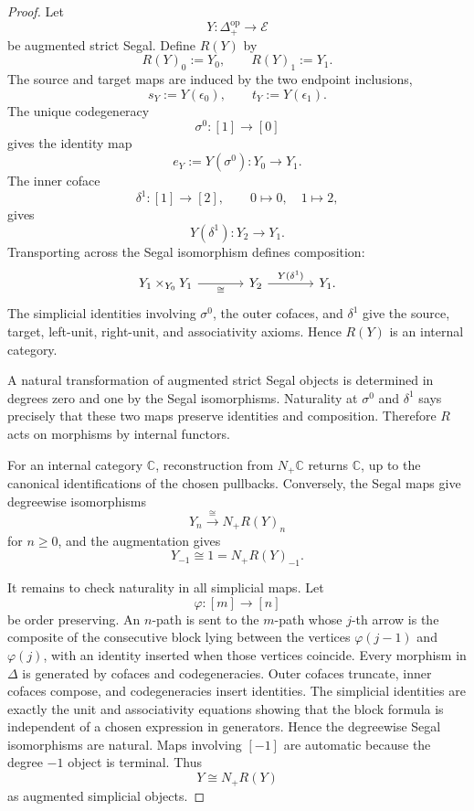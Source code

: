 \begin{proof}
Let
\[
    Y:\Delta_+^{\mathrm{op}}\to\mathcal E
\]
be augmented strict Segal. Define \(R(Y)\) by
\[
    R(Y)_0:=Y_0,
    \qquad
    R(Y)_1:=Y_1.
\]
The source and target maps are induced by the two endpoint inclusions,
\[
    s_Y:=Y(\epsilon_0),
    \qquad
    t_Y:=Y(\epsilon_1).
\]
The unique codegeneracy
\[
    \sigma^0:[1]\to[0]
\]
gives the identity map
\[
    e_Y:=Y(\sigma^0):Y_0\to Y_1.
\]
The inner coface
\[
    \delta^1:[1]\to[2],
    \qquad
    0\mapsto0,
    \quad
    1\mapsto2,
\]
gives
\[
    Y(\delta^1):Y_2\to Y_1.
\]
Transporting across the Segal isomorphism defines composition:
\[
\begin{tikzcd}[column sep=large]
    Y_1\times_{Y_0}Y_1
        \arrow[r, "\cong"']
    &
    Y_2
        \arrow[r, "{Y(\delta^1)}"]
    &
    Y_1.
\end{tikzcd}
\]
The simplicial identities involving \(\sigma^0\), the outer cofaces, and
\(\delta^1\) give the source, target, left-unit, right-unit, and associativity
axioms. Hence \(R(Y)\) is an internal category.

A natural transformation of augmented strict Segal objects is determined in
degrees zero and one by the Segal isomorphisms. Naturality at \(\sigma^0\)
and \(\delta^1\) says precisely that these two maps preserve identities and
composition. Therefore \(R\) acts on morphisms by internal functors.

For an internal category \(\mathbb C\), reconstruction from \(N_+\mathbb C\)
returns \(\mathbb C\), up to the canonical identifications of the chosen
pullbacks. Conversely, the Segal maps give degreewise isomorphisms
\[
    Y_n\xrightarrow{\cong}N_+R(Y)_n
\]
for \(n\geq0\), and the augmentation gives
\[
    Y_{-1}\cong1=N_+R(Y)_{-1}.
\]

It remains to check naturality in all simplicial maps. Let
\[
    \varphi:[m]\to[n]
\]
be order preserving. An \(n\)-path is sent to the \(m\)-path whose
\(j\)-th arrow is the composite of the consecutive block lying between the
vertices \(\varphi(j-1)\) and \(\varphi(j)\), with an identity inserted when
those vertices coincide. Every morphism in \(\Delta\) is generated by
cofaces and codegeneracies. Outer cofaces truncate, inner cofaces compose, and
codegeneracies insert identities. The simplicial identities are exactly the
unit and associativity equations showing that the block formula is independent
of a chosen expression in generators. Hence the degreewise Segal
isomorphisms are natural. Maps involving \([-1]\) are automatic because the
degree \(-1\) object is terminal. Thus
\[
    Y\cong N_+R(Y)
\]
as augmented simplicial objects.
\end{proof}

